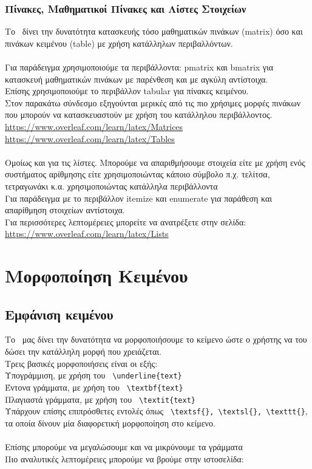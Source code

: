 \documentclass[a4paper, 12pt, oneside, xelatex, final]{article}
\begin{document}
	\subsubsection{Πίνακες, Μαθηματικοί Πίνακες και Λίστες Στοιχείων}
	\noindent Το \XeLaTeX\ δίνει την δυνατότητα κατασκευής τόσο μαθηματικών πινάκων (matrix) όσο και πινάκων κειμένου (table) με χρήση κατάλληλων περιβαλλόντων.\\ \\
	Για παράδειγμα χρησιμοποιούμε τα περιβάλλοντα: pmatrix και bmatrix για κατασκευή μαθηματικών πινάκων με παρένθεση και με αγκύλη αντίστοιχα.\\
	Επίσης χρησιμοποιούμε το περιβάλλον tabular για πίνακες κειμένου.\\
	Στον παρακάτω σύνδεσμο εξηγούνται μερικές από τις πιο χρήσιμες μορφές πινάκων που μπορούν να κατασκευαστούν με χρήση του κατάλληλου περιβάλλοντος.\\	
	\url{https://www.overleaf.com/learn/latex/Matrices}\\
	\url{https://www.overleaf.com/learn/latex/Tables}\\
	\\
	Ομοίως και για τις λίστες. Μπορούμε να απαριθμήσουμε στοιχεία είτε με χρήση ενός συστήματος αρίθμησης είτε χρησιμοποιώντας κάποιο σύμβολο π.χ. τελίτσα, τετραγωνάκι κ.α. χρησιμοποιώντας κατάλληλα περιβάλλοντα\\
	Για παράδειγμα με το περιβάλλον itemize και enumerate για παράθεση και απαρίθμηση στοιχείων αντίστοιχα.\\
	Για περισσότερες λεπτομέρειες μπορείτε να ανατρέξετε στην σελίδα:\\
	\url{https://www.overleaf.com/learn/latex/Lists}
	
\section{Μορφοποίηση Κειμένου}
	\subsection{Εμφάνιση κειμένου}
	\noindent Το \XeLaTeX\ μας δίνει την δυνατότητα να μορφοποιήσουμε το κείμενο ώστε ο χρήστης να του δώσει την κατάλληλη μορφή που χρειάζεται.\\
	Τρεις βασικές μορφοποιήσεις είναι οι εξής:\\
	Υπογράμμιση, με χρήση του \verb+ \underline{text}+\\
	Έντονα γράμματα, με χρήση του \verb+ \textbf{text}+\\
	Πλαγιαστά γράμματα, με χρήση του \verb+ \textit{text}+\\
	Υπάρχουν επίσης επιπρόσθετες εντολές όπως \verb+ \textsf{}, \textsl{}, \texttt{}+, τα οποία δίνουν μία διαφορετική μορφοποίηση στο κείμενο.\\
	\\
	Επίσης μπορούμε να μεγαλώσουμε και να μικρύνουμε τα γράμματα\\
	Πιο αναλυτικές λεπτομέρειες μπορούμε να βρούμε στην ιστοσελίδα:\\
	\problem
	
\end{document}
